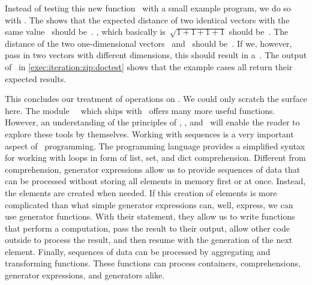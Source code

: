 Instead of testing this new function~ with a small example program, we do so with .
The  shows that the expected distance of two identical vectors with the same value~\pythonil{[1, 1]} should be~.
, which basically is~$\sqrt{1 + 1 + 1 + 1}$ should be~.
The distance of the two one-dimensional vectors~\pythonil{[100]} and~\pythonil{[10]} should be~.
If we, however, pass in two vectors with different dimensions, this should result in a~.
The output of \pytest\ in \cref{exec:iteration:zip:doctest} shows that the example cases all return their expected results.

This concludes our treatment of operations on .
We could only scratch the surface here.
The module~~\cite{PSF2024IFCIFEL} which ships with \python\ offers many more useful functions.
However, an understanding of the principles of , , and~ will enable the reader to explore these tools by themselves.%
\FloatBarrier%
\endhsection%
%
%
%
Working with sequences is a very important aspect of \python\ programming.
The programming language provides a simplified syntax for working with loops in form of list, set, and dict comprehension.
Different from comprehension, generator expressions allow us to provide sequences of data that can be processed without storing all elements in memory first or at once.
Instead, the elements are created when needed.
If this creation of elements is more complicated than what simple generator expressions can, well, express, we can use generator functions.
With their  statement, they allow us to write functions that perform a computation, pass the result to their output, allow other code outside to process the result, and then resume with the generation of the next element.
Finally, sequences of data can be processed by aggregating and transforming functions.
These functions can process containers, comprehensions, generator expressions, and generators alike.%
\endhsection%
%
\endhsection%
%
